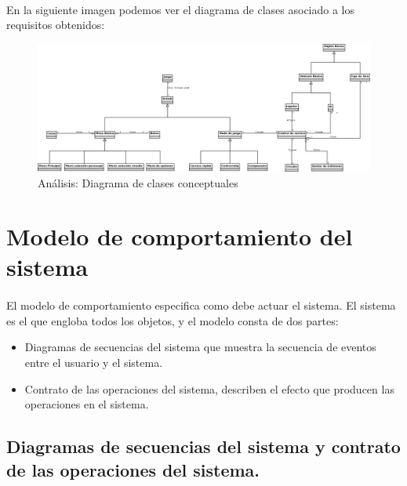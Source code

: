 \paragraph{}
En la siguiente imagen podemos ver el diagrama de clases asociado a los requisitos obtenidos:

\begin{figure}[H]
  \label{diagrama_clases_conceptuales}
  \begin{flushleft}
    \includegraphics[scale=0.25]{imagenes/diagrama_clases_conceptuales.png}
  \end{flushleft}
  \caption{Análisis: Diagrama de clases conceptuales}
\end{figure}

\section{Modelo de comportamiento del sistema}

\paragraph{}
El modelo de comportamiento especifica como debe actuar el sistema. El sistema es el que engloba todos los objetos, y el modelo
consta de dos partes:

\begin{itemize}
    \item Diagramas de secuencias del sistema que muestra la secuencia de eventos entre el usuario y el sistema.
    \item Contrato de las operaciones del sistema, describen el efecto que producen las operaciones en el sistema.
\end{itemize}

\subsection{Diagramas de secuencias del sistema y contrato de las operaciones del sistema.}

